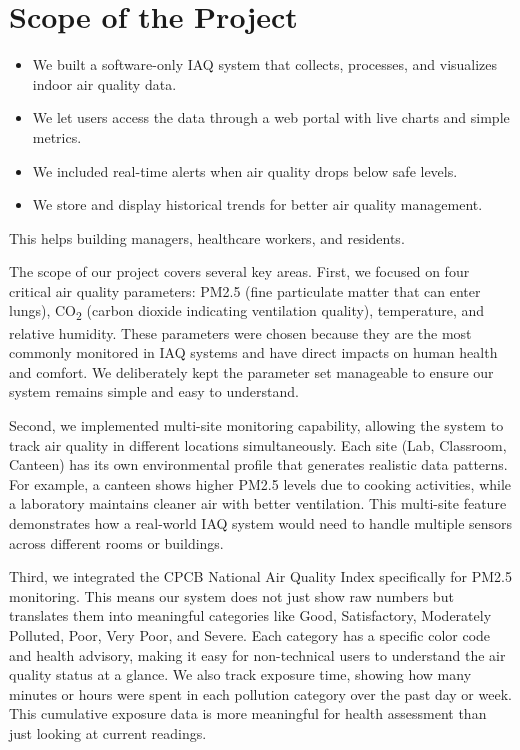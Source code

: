 \documentclass[12pt]{report}
\begin{document}
\section{Scope of the Project}
\begin{itemize}
  \item We built a software-only IAQ system that collects, processes, and visualizes indoor air quality data.
  \item We let users access the data through a web portal with live charts and simple metrics.
  \item We included real-time alerts when air quality drops below safe levels.
  \item We store and display historical trends for better air quality management.
\end{itemize}
This helps building managers, healthcare workers, and residents.

The scope of our project covers several key areas. First, we focused on four critical air quality parameters: PM2.5 (fine particulate matter that can enter lungs), CO\textsubscript{2} (carbon dioxide indicating ventilation quality), temperature, and relative humidity. These parameters were chosen because they are the most commonly monitored in IAQ systems and have direct impacts on human health and comfort. We deliberately kept the parameter set manageable to ensure our system remains simple and easy to understand.

Second, we implemented multi-site monitoring capability, allowing the system to track air quality in different locations simultaneously. Each site (Lab, Classroom, Canteen) has its own environmental profile that generates realistic data patterns. For example, a canteen shows higher PM2.5 levels due to cooking activities, while a laboratory maintains cleaner air with better ventilation. This multi-site feature demonstrates how a real-world IAQ system would need to handle multiple sensors across different rooms or buildings.

Third, we integrated the CPCB National Air Quality Index specifically for PM2.5 monitoring. This means our system does not just show raw numbers but translates them into meaningful categories like Good, Satisfactory, Moderately Polluted, Poor, Very Poor, and Severe. Each category has a specific color code and health advisory, making it easy for non-technical users to understand the air quality status at a glance. We also track exposure time, showing how many minutes or hours were spent in each pollution category over the past day or week. This cumulative exposure data is more meaningful for health assessment than just looking at current readings.
\end{document}
